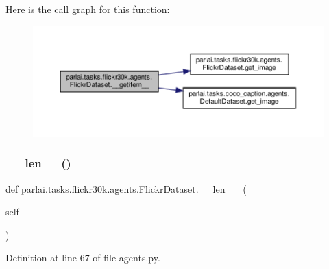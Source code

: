 Here is the call graph for this function\+:
\nopagebreak
\begin{figure}[H]
\begin{center}
\leavevmode
\includegraphics[width=350pt]{classparlai_1_1tasks_1_1flickr30k_1_1agents_1_1FlickrDataset_aba1193cd19baf55824c0ec3bd735b56f_cgraph}
\end{center}
\end{figure}
\mbox{\label{classparlai_1_1tasks_1_1flickr30k_1_1agents_1_1FlickrDataset_a2ff37f962e9df151e2bce0140dc65aa1}} 
\subsubsection{\texorpdfstring{\+\_\+\+\_\+len\+\_\+\+\_\+()}{\_\_len\_\_()}}
{\footnotesize\ttfamily def parlai.\+tasks.\+flickr30k.\+agents.\+Flickr\+Dataset.\+\_\+\+\_\+len\+\_\+\+\_\+ (\begin{DoxyParamCaption}\item[{}]{self }\end{DoxyParamCaption})}



Definition at line 67 of file agents.\+py.




